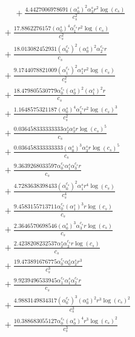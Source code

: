 \documentclass[10pt]{article}
\begin{document}
\begin{align*}
\phantom{R_{2,8}} &\phantom{={}}{}  + \frac{4.4427006978691 \left(\alpha_{0}^s\right)^{2} \alpha_{3}^s r^{2} \log{\left(c_{s} \right)}}{c_{s}^{2}} \\
&{}  + \frac{17.8862276157 \left(\alpha_{0}^s\right)^{4} \alpha_{1}^{c_s} r^{2} \log{\left(c_{s} \right)}}{c_{s}^{2}} \\
&{}  + \frac{18.013082452931 \left(\alpha_{0}^{c_s}\right)^{2} \left(\alpha_{0}^s\right)^{2} \alpha_{2}^{c_s} r}{c_{s}} \\
&{}  + \frac{9.1744078821009 \left(\alpha_{1}^{c_s}\right)^{2} \alpha_{1}^s r^{2} \log{\left(c_{s} \right)}}{c_{s}^{2}} \\
&{}  + \frac{18.479805530779 \alpha_{0}^{c_s} \left(\alpha_{0}^s\right)^{2} \left(\alpha_{1}^s\right)^{2} r}{c_{s}} \\
&{}  + \frac{1.1648575321187 \left(\alpha_{0}^s\right)^{4} \alpha_{1}^{c_s} r^{2} \log{\left(c_{s} \right)}^{3}}{c_{s}^{2}} \\
&{}  + \frac{0.036458333333333 \alpha_{2}^s \alpha_{3}^s r \log{\left(c_{s} \right)}^{5}}{c_{s}} \\
&{}  + \frac{0.036458333333333 \left(\alpha_{0}^s\right)^{3} \alpha_{3}^s r \log{\left(c_{s} \right)}^{5}}{c_{s}} \\
&{}  + \frac{9.3639268033597 \alpha_{0}^{c_s} \alpha_{1}^s \alpha_{3}^{c_s} r}{c_{s}} \\
&{}  + \frac{4.7283638398433 \left(\alpha_{0}^{c_s}\right)^{2} \alpha_{1}^s r^{4} \log{\left(c_{s} \right)}}{c_{s}^{4}} \\
&{}  + \frac{9.4583155713711 \alpha_{0}^{c_s} \left(\alpha_{1}^s\right)^{3} r \log{\left(c_{s} \right)}}{c_{s}} \\
&{}  + \frac{2.3646570698546 \left(\alpha_{0}^s\right)^{3} \alpha_{3}^{c_s} r \log{\left(c_{s} \right)}}{c_{s}} \\
&{}  + \frac{2.4238208232537 \alpha_{2}^s \alpha_{3}^{c_s} r \log{\left(c_{s} \right)}}{c_{s}} \\
&{}  + \frac{19.473891676775 \alpha_{0}^{c_s} \alpha_{0}^s \alpha_{2}^s r^{3}}{c_{s}^{3}} \\
&{}  + \frac{9.9239496533945 \alpha_{1}^{c_s} \alpha_{1}^s \alpha_{2}^{c_s} r}{c_{s}} \\
&{}  + \frac{4.9883149834317 \left(\alpha_{0}^{c_s}\right)^{3} \left(\alpha_{0}^s\right)^{2} r^{3} \log{\left(c_{s} \right)}^{2}}{c_{s}^{3}} \\
&{}  + \frac{10.388683055127 \alpha_{0}^{c_s} \left(\alpha_{0}^s\right)^{4} r^{3} \log{\left(c_{s} \right)}^{2}}{c_{s}^{3}} \\

\end{align*}
\end{document}
